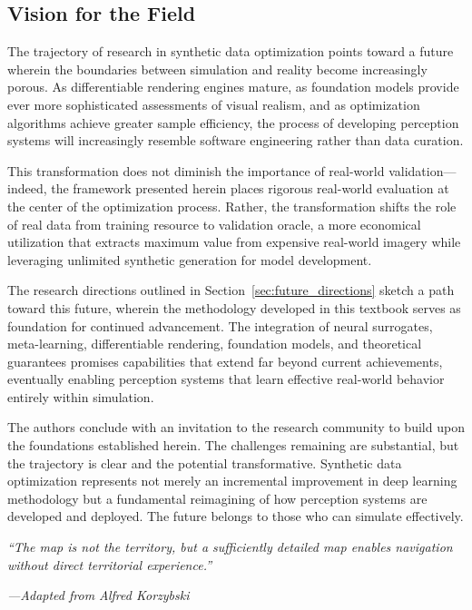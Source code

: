 \subsection{Vision for the Field}
\label{subsec:vision}

The trajectory of research in synthetic data optimization points toward a future wherein the boundaries between simulation and reality become increasingly porous. As differentiable rendering engines mature, as foundation models provide ever more sophisticated assessments of visual realism, and as optimization algorithms achieve greater sample efficiency, the process of developing perception systems will increasingly resemble software engineering rather than data curation.

This transformation does not diminish the importance of real-world validation---indeed, the framework presented herein places rigorous real-world evaluation at the center of the optimization process. Rather, the transformation shifts the role of real data from training resource to validation oracle, a more economical utilization that extracts maximum value from expensive real-world imagery while leveraging unlimited synthetic generation for model development.

The research directions outlined in Section~\ref{sec:future_directions} sketch a path toward this future, wherein the methodology developed in this textbook serves as foundation for continued advancement. The integration of neural surrogates, meta-learning, differentiable rendering, foundation models, and theoretical guarantees promises capabilities that extend far beyond current achievements, eventually enabling perception systems that learn effective real-world behavior entirely within simulation.

The authors conclude with an invitation to the research community to build upon the foundations established herein. The challenges remaining are substantial, but the trajectory is clear and the potential transformative. Synthetic data optimization represents not merely an incremental improvement in deep learning methodology but a fundamental reimagining of how perception systems are developed and deployed. The future belongs to those who can simulate effectively.

\vspace{1cm}

\begin{center}
\textit{``The map is not the territory, but a sufficiently detailed map enables navigation without direct territorial experience.''}

\vspace{0.3cm}
\textit{---Adapted from Alfred Korzybski}
\end{center}
